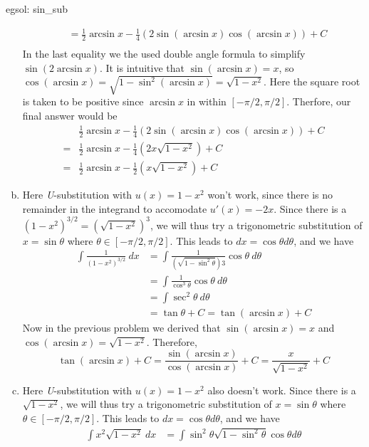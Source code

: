 \begin{egsol}[]{egsol: sin_sub}
\begin{enumerate}[a)]
\begin{align*}
            &= \frac{1}{2}\arcsin x - \frac{1}{4}(2 \sin (\arcsin x) \cos (\arcsin x)) + C\\
        \end{align*}
        In the last equality we the used double angle formula to simplify $\sin(2\arcsin x)$.  It is intuitive that $\sin(\arcsin x) = x$, so $\cos(\arcsin x) = \sqrt{1-\sin^2(\arcsin x)} = \sqrt{1-x^2}$.  Here the square root is taken to be positive since $\arcsin x$ in within $[-\pi/2, \pi/2]$.  Therfore, our final answer would be
        \begin{align*}
            &\frac{1}{2}\arcsin x - \frac{1}{4}(2 \sin (\arcsin x) \cos (\arcsin x)) + C\\
            =&\frac{1}{2}\arcsin x - \frac{1}{4}(2x\sqrt{1-x^2}) + C\\
            =&\frac{1}{2}\arcsin x - \frac{1}{2}(x\sqrt{1-x^2}) + C
        \end{align*}
        \item Here \textit{U}-substitution with $u(x) = 1-x^2$ won't work, since there is no remainder in the integrand to accomodate $u'(x) = -2x$.  Since there is a $(1-x^2)^{3/2} = (\sqrt{1-x^2})^3$, we will thus try a trigonometric substitution of $x = \sin \theta$ where $\theta \in [-\pi/2, \pi/2]$.  This leads to $dx = \cos \theta d\theta$, and we have
        \begin{align*}
            \int \frac{1}{(1-x^2)^{3/2}}~dx &= \int \frac{1}{(\sqrt{1-\sin^2\theta})3} \cos\theta~d\theta\\
            &= \int \frac{1}{\cos^3 \theta} \cos\theta~d\theta\\
            &= \int \sec^2 \theta~d\theta \\
            &= \tan \theta + C = \tan (\arcsin x) + C
        \end{align*}
        Now in the previous problem we derived that $\sin(\arcsin x) = x$ and $\cos(\arcsin x) = \sqrt{1-x^2}$.  Therefore, 
        \[\tan (\arcsin x) + C = \frac{\sin(\arcsin x)}{\cos(\arcsin x)} + C = \frac{x}{\sqrt{1-x^2}} + C\]
        \item Here \textit{U}-substitution with $u(x) = 1-x^2$ also doesn't work.  Since there is a $\sqrt{1-x^2}$, we will thus try a trigonometric substitution of $x = \sin \theta$ where $\theta \in [-\pi/2, \pi/2]$.  This leads to $dx = \cos \theta d\theta$, and we have
        \begin{align*}
            \int x^2\sqrt{1-x^2}~dx &= \int \sin^2\theta \sqrt{1-\sin^2\theta} \cos\theta d\theta\\

\end{align*}
\end{enumerate}
\end{egsol}
